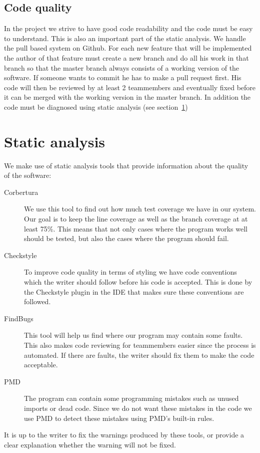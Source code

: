 \documentclass[a4paper]{article}
\begin{document}
\subsection{Code quality}
In the project we strive to have good code readability and the code must be easy to understand. This is also an important part of the static analysis. We handle the pull based system on Github. For each new feature that will be implemented the author of that feature must create a new branch and do all his work in that branch so that the master branch always consists of a working version of the software. If someone wants to commit he has to make a pull request first. His code will then be reviewed by at least 2 teammembers and eventually fixed before it can be merged with the working version in the master branch. In addition the code must be diagnosed using static analysis (see section~\ref{sec:static})

\section{Static analysis}
\label{sec:static}
We make use of static analysis tools that provide information about the quality of the software:
\begin{description}
\item[Corbertura] We use this tool to find out how much test coverage we have in our system. Our goal is to keep the line coverage as well as the branch coverage at at least 75\%. This means that not only cases where the program works well should be tested, but also the cases where the program should fail.
\item[Checkstyle] To improve code quality in terms of styling we have code conventions which the writer should follow before his code is accepted. This is done by the Checkstyle plugin in the IDE that makes sure these conventions are followed.
\item[FindBugs] This tool will help us find where our program may contain some faults. This also makes code reviewing for teammembers easier since the process is automated. If there are faults, the writer should fix them to make the code acceptable.
\item[PMD] The program can contain some programming mistakes such as unused imports or dead code. Since we do not want these mistakes in the code we use PMD to detect these mistakes using PMD's built-in rules.
\end{description}

It is up to the writer to fix the warnings produced by these tools, or provide a clear explanation whether the warning will not be fixed.
\end{document}
